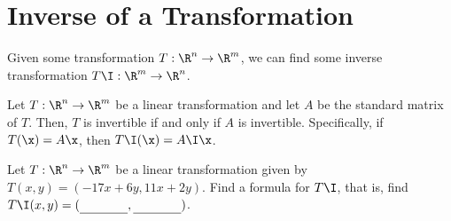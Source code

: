 
\section{Inverse of a Transformation}
\label{sec:inverse_of_a_transformation}

Given some transformation $T : \R^n \to \R^m$, we can find some inverse
transformation $T\I : \R^m \to \R^n$.

\begin{theorem}
  \label{thm:inverse_of_a_transformation}

  Let $T : \R^n \to \R^m$ be a linear transformation and let $A$ be the
  standard matrix of $T$. Then, $T$ is invertible if and only if $A$ is
  invertible. Specifically, if $T(\x) = A\x$, then $T\I(\x) = A\I\x$.
\end{theorem}

\begin{question}
  \label{qst:inverse_of_a_transformation}

  Let $T : \R^n \to \R^m$ be a linear transformation given by $T(x,y) =
  (-17x + 6y, 11x + 2y)$. Find a formula for $T\I$, that is, find
  $T\I(x,y)=(\underline{\phantom{Ax+By}},\underline{\phantom{Ax+By}})$.
\end{question}

